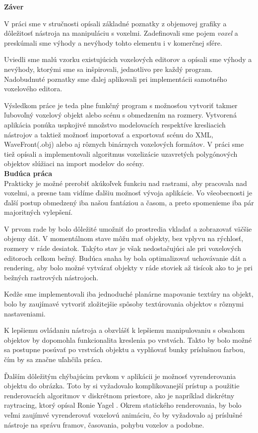 \clearpage
\begin{Huge}
\textbf{Záver} \\
\end{Huge}

V práci sme v stručnosti opísali základné poznatky z objemovej grafiky a dôležitosť nástroja na manipuláciu s voxelmi. Zadefinovali sme pojem \textit{voxel} a preskúmali sme výhody a nevýhody tohto elementu i v komerčnej sfére.

Uviedli sme malú vzorku existujúcich voxelových editorov a opísali sme výhody a nevýhody, ktorými sme sa inšpirovali, jednotlivo pre každý program.
Nadobudnuté poznatky sme ďalej aplikovali pri implementácii samotného voxelového editora.

Výsledkom práce je teda plne funkčný program s možnosťou vytvoriť takmer ľubovoľný voxelový objekt alebo scénu s obmedzením na rozmery. Vytvorená aplikácia ponúka uspkojivé množstvo modelovacích respektíve kresliacich nástrojov a taktiež možnosť importovať a exportovať scénu do XML, WaveFront(.obj) alebo aj rôznych binárnych voxelových formátov. V práci sme tiež opísali a implementovali algoritmus voxelizácie uzavretých polygónových objektov slúžiaci na import modelov do scény. \\

\textbf{Budúca práca} \\

Prakticky je možné prerobiť akúkoľvek funkciu nad rastrami, aby pracovala nad voxelmi, a presne tam vidíme ďalšiu možnosť vývoja aplikácie. Vo všeobecnosti je ďalší postup obmedzený iba našou fantáziou a časom, a preto spomenieme iba pár majoritných vylepšení. 

V prvom rade by bolo dôležité umožniť do prostredia vkladať a zobrazovať väčšie objemy dát. V momentálnom stave môžu mať objekty, bez vplyvu na rýchlosť, rozmery v ráde desiatok. Takýto stav je však nedostačujúci ale pri voxelových editoroch celkom bežný. Budúca snaha by bola optimalizovať uchovávanie dát a rendering, aby bolo možné vytvárať objekty v ráde stoviek až tisícok ako to je pri bežných rastrových nástrojoch.

Kedže sme implementovali iba jednoduché planárne mapovanie textúry na objekt, bolo by zaujímavé vytvoriť zložitejšie spôsoby textúrovania objektov s rôznymi nastaveniami.

K lepšiemu ovládaniu nástroja a obzvlášť k lepšiemu manipulovaniu s obsahom objektov by dopomohla funkcionalita kreslenia po vrstvách. Takto by bolo možné sa postupne posúvať po vrstvách objektu a vyplňovať bunky príslušnou farbou, čím by sa značne uľahčila práca.

Ďalším dôležitým chýbajúcim prvkom v aplikácii je možnosť vyrenderovania objektu do obrázka. Toto by si vyžadovalo komplikovanejší prístup a použitie renderovacích algoritmov v diskrétnom priestore, ako je napríklad diskrétny raytracing, ktorý opísal Ronie Yagel \cite{RayTracing}.
Okrem statického renderovania, by bolo veľmi zaujímvé vyrenderovať voxelovú animáciu, čo by vyžadovalo aj príslušné nástroje na správu framov, časovania, pohybu voxelov a podobne.
